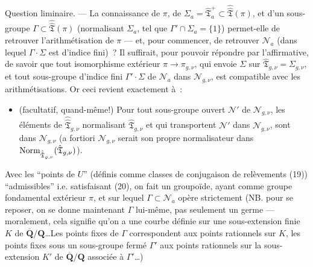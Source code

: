 Question liminaire. --- La connaissance de $\pi$, de $\Sigma_a=\hat{\mathfrak{T}}^+_a\subset \hat{\hat{\mathfrak{T}}}(\pi)$, et d'un sous-groupe $\Gamma\subset \hat{\hat{\mathfrak{T}}}(\pi)$ (normalisant $\Sigma_a$, tel que $\Gamma'\cap\Sigma_a=\{1\}$) permet-elle de retrouver l'arithmétisation de $\pi$ --- et, pour commencer, de retrouver $\mathcal{N}_a$ (dans lequel $\Gamma \cdot \Sigma$ est d'indice fini)~? Il suffirait, pour pouvoir répondre par l'affirmative, de savoir que tout isomorphisme extérieur $\pi\to\pi_{g,\nu}$, qui envoie $\Sigma$ sur $\hat{\mathfrak{T}}_{g,\nu}=\Sigma_{g,\nu}$, et tout sous-groupe d'indice fini $\Gamma'\cdot\Sigma$ de $\mathcal{N}_a$ dans $\mathcal{N}_{g,\nu}$, est compatible avec les arithmétisations. Or ceci revient exactement à~:
\begin{itemize}
	\item[(g)] (facultatif, quand-même!) Pour tout sous-groupe ouvert $\mathcal{N}'$ de $\mathcal{N}_{g,\nu}$, les éléments de $\hat{\hat{\mathfrak{T}}}_{g,\nu}$ normalisant $\hat{\mathfrak{T}}_{g,\nu}$ et qui transportent $\mathcal{N}'$ dans $\mathcal{N}_{g,\nu}$, sont dans $\mathcal{N}_{g,\nu}$ (a fortiori $\mathcal{N}_{g,\nu}$ serait son propre normalisateur dans ${\rm Norm}_{\hat{\hat{\mathfrak{T}}}_{g,\nu}}(\hat{\mathfrak{T}}_{g,\nu})$).
\end{itemize}
Avec les ``points de $U$'' (définis comme classes de conjugaison de relèvements (19)) ``admissibles'' i.e. satisfaisant (20), on fait un groupoïde, ayant comme groupe fondamental extérieur $\pi$, et sur lequel $\Gamma\subset \mathcal{N}_a$ opère strictement (NB. pour se reposer, on se donne maintenant $\Gamma$ lui-même, pas seulement un germe --- moralement, cela signifie qu'on a une courbe définie sur une sous-extension finie $K$ de $\overline{\mathbf{Q}}/{\mathbf{Q}}$\dots Les points fixes de $\Gamma$ correspondent aux points rationnels sur $K$, les points fixes sous un sous-groupe fermé $\Gamma'$ aux points rationnels sur la sous-extension $K'$ de $\overline{\mathbf{Q}}/{\mathbf{Q}}$ associée à $\Gamma'$\dots)

